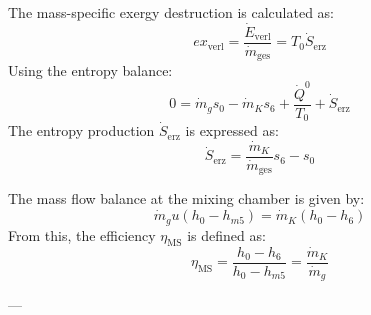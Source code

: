 The mass-specific exergy destruction is calculated as:  
\[
ex_{\text{verl}} = \frac{\dot{E}_{\text{verl}}}{\dot{m}_{\text{ges}}} = T_0 \dot{S}_{\text{erz}}
\]  
Using the entropy balance:  
\[
0 = \dot{m}_g s_0 - \dot{m}_K s_6 + \frac{\dot{Q}^0}{T_0} + \dot{S}_{\text{erz}}
\]  
The entropy production \( \dot{S}_{\text{erz}} \) is expressed as:  
\[
\dot{S}_{\text{erz}} = \frac{\dot{m}_K}{\dot{m}_{\text{ges}}} s_6 - s_0
\]  

The mass flow balance at the mixing chamber is given by:  
\[
\dot{m}_g u(h_0 - h_{m5}) = \dot{m}_K (h_0 - h_6)
\]  
From this, the efficiency \( \eta_{\text{MS}} \) is defined as:  
\[
\eta_{\text{MS}} = \frac{h_0 - h_6}{h_0 - h_{m5}} = \frac{\dot{m}_K}{\dot{m}_g}
\]  

---